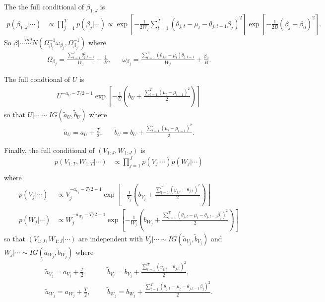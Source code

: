 \documentclass[graybox]{svmult}
\begin{document}
The the full conditional of $\beta_{1:J}$ is
\begin{align*}
p(\beta_{1:J}|\cdots) &\propto \prod_{j=1}^Tp(\beta_j|\cdots) \propto \exp\left[-\frac{1}{2W_j}\sum_{t=1}^T(\theta_{j,t} - \mu_t - \theta_{j,t-1}\beta_j)^2\right]\exp\left[-\frac{1}{2B}(\beta_j - \beta_0)^2\right].
\end{align*}
So $\beta|\cdots \stackrel{ind}{\sim} N(\Omega_{\beta_j}^{-1}\omega_{\beta_j},\Omega_{\beta_j}^{-1})$ where
\begin{align*}
\Omega_{\beta_j}=\frac{\sum_{t=1}^T\theta_{j,t-1}^2}{W_j} + \frac{1}{B},&&\omega_{\beta_j}=\frac{\sum_{t=1}^T(\theta_{j,t} - \mu_t)\theta_{j,t-1}}{W_j} + \frac{\beta_0}{B}.
\end{align*}
 
The full condtional of $U$ is
\begin{align*}
U^{-a_U - T/2 - 1}\exp\left[-\frac{1}{U}\left(b_U + \frac{\sum_{t=1}^T(\mu_t - \mu_{t-1})^2}{2}\right)\right]
\end{align*}
so that $U|\cdots \sim IG(\tilde{a}_U, \tilde{b}_U)$
where
\begin{align*}
\tilde{a}_U = a_U + \frac{T}{2},&& \tilde{b}_U = b_U + \frac{\sum_{t=1}^T(\mu_t - \mu_{t-1})^2}{2}.
\end{align*}

Finally, the full conditional of $(V_{1:J},W_{1:J})$ is
\begin{align*}
p(V_{1:T},W_{1:T}|\cdots)&\propto \prod_{j=1}^Jp(V_j|\cdots)p(W_j|\cdots)\\
\end{align*}
where
\begin{align*}
p(V_j|\cdots) &\propto V_j^{-a_{V_j}-T/2-1}\exp\left[-\frac{1}{V_j}\left(b_{V_j} + \frac{\sum_{t=1}^T(y_{j,t} - \theta_{j,t})^2}{2}\right)\right]\\
p(W_j|\cdots) &\propto W_j^{-a_{W_j}-T/2-1}\exp\left[-\frac{1}{W_j}\left(b_{W_j} + \frac{\sum_{t=1}^T(\theta_{j,t} - \mu_t - \theta_{j,t-1}\beta_j)^2}{2}\right)\right]
\end{align*}
so that $(V_{1:J},W_{1:J}|\cdots)$ are independent with $V_j|\cdots \sim IG(\tilde{a}_{V_j},\tilde{b}_{V_j})$ and $W_j|\cdots \sim IG(\tilde{a}_{W_j},\tilde{b}_{W_j})$ where
\begin{align*}
\tilde{a}_{V_j} = a_{V_j} + \frac{T}{2},&&& \tilde{b}_{V_j} = b_{V_j} + \frac{\sum_{t=1}^T(y_{j,t} - \theta_{j,t})^2}{2},\\
\tilde{a}_{W_j}=a_{W_j} + \frac{T}{2},&&& \tilde{b}_{W_j} = b_{W_j} + \frac{\sum_{t=1}^T(\theta_{j,t} - \mu_t - \theta_{j,t-1}\beta_j)^2}{2}.
\end{align*}
\end{document}
